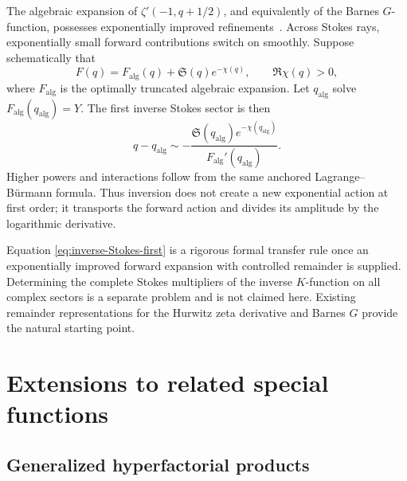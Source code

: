 \documentclass[11pt,oneside]{article}
\theoremstyle{plain}
\theoremstyle{definition}
\theoremstyle{remark}
\begin{document}
The algebraic expansion of \(\zeta'(-1,q+1/2)\), and equivalently of the Barnes
\(G\)-function, possesses exponentially improved refinements~\cite{Nemes2014,Nemes2017}.  Across Stokes
rays, exponentially small forward contributions switch on smoothly.  Suppose
schematically that
\begin{equation}
 F(q)=F_{\mathrm{alg}}(q)+\mathfrak{S}(q)e^{-\chi(q)},
 \qquad \Re\chi(q)>0,
 \label{eq:forward-Stokes}
\end{equation}
where \(F_{\mathrm{alg}}\) is the optimally truncated algebraic expansion.
Let \(q_{\mathrm{alg}}\) solve
\(F_{\mathrm{alg}}(q_{\mathrm{alg}})=Y\).  The first inverse Stokes sector is
then
\begin{equation}
 q-q_{\mathrm{alg}}
 \sim-\frac{\mathfrak{S}(q_{\mathrm{alg}})
 e^{-\chi(q_{\mathrm{alg}})}}
 {F_{\mathrm{alg}}'(q_{\mathrm{alg}})}.
 \label{eq:inverse-Stokes-first}
\end{equation}
Higher powers and interactions follow from the same anchored
Lagrange--B\"urmann formula.  Thus inversion does not create a new exponential
action at first order; it transports the forward action and divides its
amplitude by the logarithmic derivative.

\begin{statusbox}
Equation \eqref{eq:inverse-Stokes-first} is a rigorous formal transfer rule once
an exponentially improved forward expansion with controlled remainder is
supplied.  Determining the complete Stokes multipliers of the inverse
\(K\)-function on all complex sectors is a separate problem and is not claimed
here.  Existing remainder representations for the Hurwitz zeta derivative and
Barnes \(G\) provide the natural starting point.
\end{statusbox}

\section{Extensions to related special functions}
\label{sec:extensions}

\subsection{Generalized hyperfactorial products}
\end{document}
